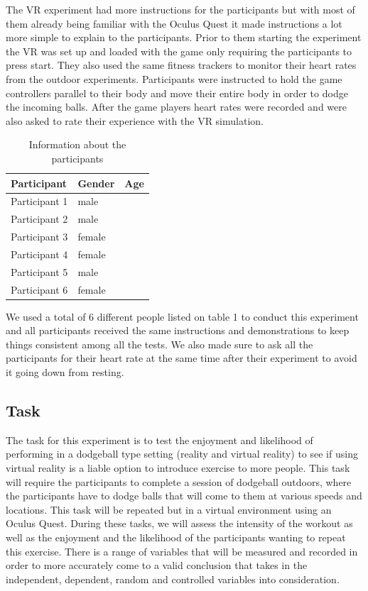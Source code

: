\documentclass{sigchi}
\begin{document}
The VR experiment had more instructions for the participants but with most of them already being familiar with the Oculus Quest it made instructions a lot more simple to explain to the participants. Prior to them starting the experiment the VR was set up and loaded with the game only requiring the participants to press start. They also used the same fitness trackers to monitor their heart rates from the outdoor experiments. Participants were instructed to hold the game controllers parallel to their body and move their entire body in order to dodge the incoming balls. After the game players heart rates were recorded and were also asked to rate their experience with the VR simulation. 


\setlength{\arrayrulewidth}{1mm}
\setlength{\tabcolsep}{8pt}
\renewcommand{\arraystretch}{1.25}
{
\begin{table}
\begin{tabularx}{0.45\textwidth}{ 
  | >{\centering\arraybackslash}X 
  | >{\centering\arraybackslash}X 
  | >{\centering\arraybackslash}X | }
\hline
Participant & Gender & Age \\
\hline
Participant 1 & male & 52 \\
\hline
Participant 2 & male & 22 \\
\hline
Participant 3 & female & 54 \\
\hline
Participant 4 & female & 30 \\
\hline
Participant 5 & male & 37 \\
\hline
Participant 6 & female & 22 \\
\hline
\end{tabularx}
\caption{Information about the participants}
\label{tab:my_label1}
\end{table}
}

We used a total of 6 different people listed on table 1 to conduct this experiment and all participants received the same instructions and demonstrations to keep things consistent among all the tests. We also made sure to ask all the participants for their heart rate at the same time after their experiment to avoid it going down from resting.  

\subsection{Task}
The task for this experiment is to test the enjoyment and likelihood of performing in a dodgeball type setting (reality and virtual reality) to see if using virtual reality is a liable option to introduce exercise to more people. This task will require the participants to complete a session of dodgeball outdoors, where the participants have to dodge balls that will come to them at various speeds and locations. This task will be repeated but in a virtual environment using an Oculus Quest. During these tasks, we will assess the intensity of the workout as well as the enjoyment and the likelihood of the participants wanting to repeat this exercise. There is a range of variables that will be measured and recorded in order to more accurately come to a valid conclusion that takes in the independent, dependent, random and controlled variables into consideration.
\end{document}
